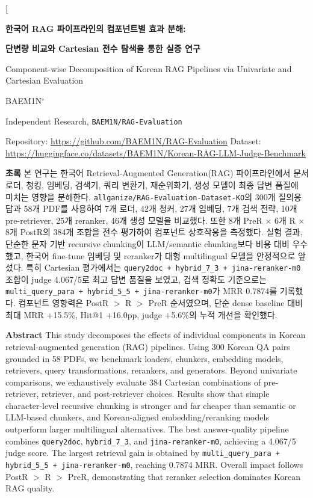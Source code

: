 \documentclass[10pt,a4paper,twocolumn]{article}
\newcommand{\code}[1]{\texttt{#1}}
\newcommand{\dataset}{\code{allganize/RAG-Evaluation-Dataset-KO}}
\newcommand{\repo}{\code{BAEM1N/RAG-Evaluation}}
\begin{document}
\makeatletter
\twocolumn[
\begin{@twocolumnfalse}
\begin{center}
{\LARGE\bfseries 한국어 RAG 파이프라인의 컴포넌트별 효과 분해:\par}
\vspace{2mm}
{\Large\bfseries 단변량 비교와 Cartesian 전수 탐색을 통한 실증 연구\par}
\vspace{2mm}
{\large Component-wise Decomposition of Korean RAG Pipelines via Univariate and Cartesian Evaluation\par}
\vspace{4mm}
{BAEM1N$^{\circ}$}\par
{\small Independent Research, \repo}\par
{\small Repository: \url{https://github.com/BAEM1N/RAG-Evaluation} \quad Dataset: \url{https://huggingface.co/datasets/BAEM1N/Korean-RAG-LLM-Judge-Benchmark}}\par
\end{center}
\vspace{2mm}
{\raggedright
\noindent\textbf{초록}\quad
본 연구는 한국어 Retrieval-Augmented Generation(RAG) 파이프라인에서 문서 로더, 청킹, 임베딩, 검색기, 쿼리 변환기, 재순위화기, 생성 모델이 최종 답변 품질에 미치는 영향을 분해한다. \dataset{}의 300개 질의응답과 58개 PDF를 사용하여 7개 로더, 42개 청커, 27개 임베딩, 7개 검색 전략, 10개 pre-retriever, 25개 reranker, 46개 생성 모델을 비교했다. 또한 8개 PreR $\times$ 6개 R $\times$ 8개 PostR의 384개 조합을 전수 평가하여 컴포넌트 상호작용을 측정했다. 실험 결과, 단순한 문자 기반 recursive chunking이 LLM/semantic chunking보다 비용 대비 우수했고, 한국어 fine-tune 임베딩 및 reranker가 대형 multilingual 모델을 안정적으로 앞섰다. 특히 Cartesian 평가에서는 \code{query2doc + hybrid\_7\_3 + jina-reranker-m0} 조합이 judge 4.067/5로 최고 답변 품질을 보였고, 검색 정확도 기준으로는 \code{multi\_query\_para + hybrid\_5\_5 + jina-reranker-m0}가 MRR 0.7874를 기록했다. 컴포넌트 영향력은 PostR $>$ R $>$ PreR 순서였으며, 단순 dense baseline 대비 최대 MRR +15.5\%, Hit@1 +16.0pp, judge +5.6\%의 누적 개선을 확인했다.

\vspace{1mm}
\noindent\textbf{Abstract}\quad
This study decomposes the effects of individual components in Korean retrieval-augmented generation (RAG) pipelines. Using 300 Korean QA pairs grounded in 58 PDFs, we benchmark loaders, chunkers, embedding models, retrievers, query transformations, rerankers, and generators. Beyond univariate comparisons, we exhaustively evaluate 384 Cartesian combinations of pre-retriever, retriever, and post-retriever choices. Results show that simple character-level recursive chunking is stronger and far cheaper than semantic or LLM-based chunkers, and Korean-aligned embedding/reranking models outperform larger multilingual alternatives. The best answer-quality pipeline combines \code{query2doc}, \code{hybrid\_7\_3}, and \code{jina-reranker-m0}, achieving a 4.067/5 judge score. The largest retrieval gain is obtained by \code{multi\_query\_para + hybrid\_5\_5 + jina-reranker-m0}, reaching 0.7874 MRR. Overall impact follows PostR $>$ R $>$ PreR, demonstrating that reranker selection dominates Korean RAG quality.

}
\end{@twocolumnfalse}
\end{document}
